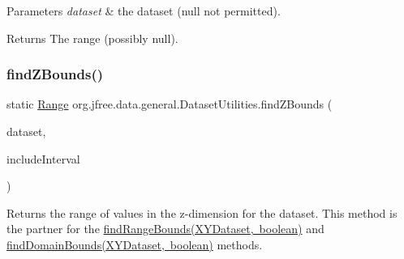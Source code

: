 \begin{DoxyParams}{Parameters}
{\em dataset} & the dataset ({\ttfamily null} not permitted).\\
\hline
\end{DoxyParams}
\begin{DoxyReturn}{Returns}
The range (possibly {\ttfamily null}). 
\end{DoxyReturn}
\mbox{\label{classorg_1_1jfree_1_1data_1_1general_1_1_dataset_utilities_a4fc28f4d39c8859fa041ba4af0f33137}} 
\subsubsection{\texorpdfstring{find\+Z\+Bounds()}{findZBounds()}\hspace{0.1cm}{\footnotesize\ttfamily [2/3]}}
{\footnotesize\ttfamily static \mbox{\hyperlink{classorg_1_1jfree_1_1data_1_1_range}{Range}} org.\+jfree.\+data.\+general.\+Dataset\+Utilities.\+find\+Z\+Bounds (\begin{DoxyParamCaption}\item[{\mbox{\hyperlink{interfaceorg_1_1jfree_1_1data_1_1xy_1_1_x_y_z_dataset}{X\+Y\+Z\+Dataset}}}]{dataset,  }\item[{boolean}]{include\+Interval }\end{DoxyParamCaption})\hspace{0.3cm}{\ttfamily [static]}}

Returns the range of values in the z-\/dimension for the dataset. This method is the partner for the \mbox{\hyperlink{classorg_1_1jfree_1_1data_1_1general_1_1_dataset_utilities_ab8786c80dc8295cf2e52b972eb2b2cda}{find\+Range\+Bounds(\+X\+Y\+Dataset, boolean)}} and \mbox{\hyperlink{classorg_1_1jfree_1_1data_1_1general_1_1_dataset_utilities_a0841a95a5e3f28ef32ce8ff8366370dc}{find\+Domain\+Bounds(\+X\+Y\+Dataset, boolean)}} methods.



